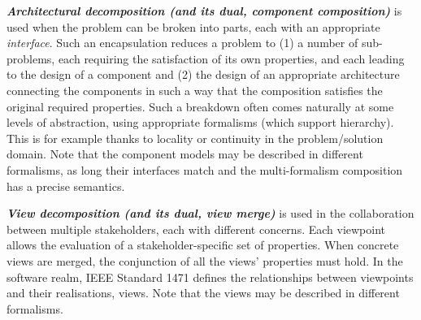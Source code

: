\noindent
\textbf{\emph{Architectural decomposition (and its dual, component composition)}} is used when
    the problem can be broken into parts, each with an appropriate \emph{interface}.
    Such an encapsulation reduces a problem to (1) a number of sub-problems, each requiring 
    the satisfaction of its own properties, and each leading to the 
    design of a component and (2) the design of an appropriate architecture connecting the components
    in such a way that the composition satisfies the original required properties.
    Such a breakdown often comes naturally at some levels of abstraction, using appropriate formalisms
    (which support hierarchy).
    This is for example thanks to locality or continuity in the problem/solution domain.
    Note that the component models may be described in different formalisms, as long their interfaces match and the multi-formalism composition has a precise semantics.
    
\noindent
\textbf{\emph{View decomposition (and its dual, view merge)}} is used in the 
    collaboration between multiple stakeholders, each with different concerns.
    Each viewpoint allows the evaluation of a stakeholder-specific set of properties. 
    When concrete views are merged, the conjunction of all the views' properties must hold.
    In the software realm, IEEE Standard 1471 defines the relationships between viewpoints and 
    their realisations, views.
    Note that the views may be described in different formalisms.



% 


%


